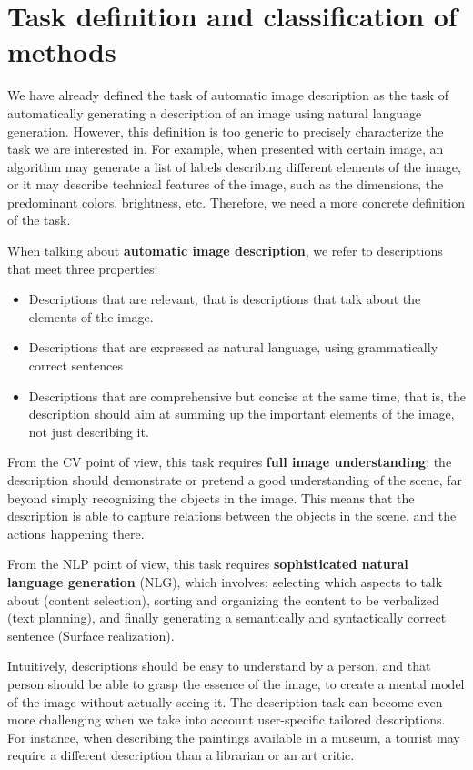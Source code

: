 \section{Task definition and classification of methods}\label{sec:task-definition}

We have already defined the task of automatic image description as the task of automatically generating a description of an image using natural language generation. However, this definition is too generic to precisely characterize the task we are interested in. For example, when presented with certain image, an algorithm may generate a list of labels describing different elements of the image, or it may describe technical features of the image, such as the dimensions, the predominant colors, brightness, etc. Therefore, we need a more concrete definition of the task.

When talking about \textbf{automatic image description}, we refer to descriptions that meet three properties:
\begin{itemize}
\item Descriptions that are relevant, that is descriptions that talk about the elements of the image.
\item Descriptions that are expressed as natural language, using grammatically correct sentences
\item Descriptions that are comprehensive but concise at the same time, that is, the description should aim at summing up the important elements of the image, not just describing it.
\end{itemize}

From the CV point of view, this task requires \textbf{full image understanding}: the description should demonstrate or pretend a good understanding of the scene, far beyond simply recognizing the objects in the image. This means that the description is able to capture relations between the objects in the scene, and the actions happening there.

From the NLP point of view, this task requires \textbf{sophisticated natural language generation} (NLG), which involves: selecting which aspects to talk about (content selection), sorting and organizing the content to be verbalized (text planning), and finally generating a semantically and syntactically correct sentence (Surface realization).

Intuitively, descriptions should be easy to understand by a person, and that person should be able to grasp the essence of the image, to create a mental model of the image without actually seeing it. The description task can become even more challenging when we take into account user-specific tailored descriptions. For instance, when describing the paintings available in a museum, a tourist may require a different description than a librarian or an art critic.

